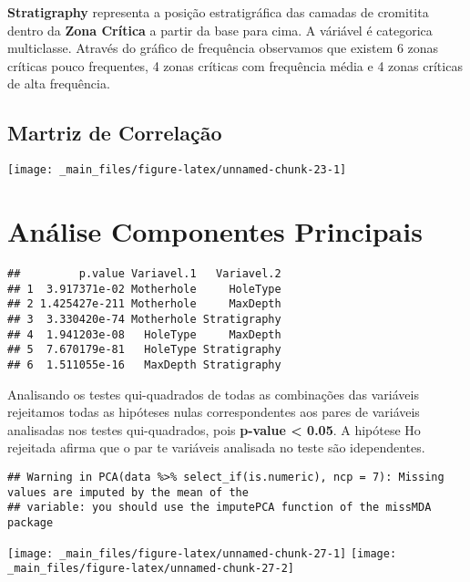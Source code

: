 \documentclass[
]{article}
\begin{document}
\textbf{Stratigraphy} representa a posição estratigráfica das camadas de cromitita dentro da \textbf{Zona Crítica} a partir da base para cima. A váriável é categorica multiclasse. Através do gráfico de frequência observamos que existem 6 zonas críticas pouco frequentes, 4 zonas críticas com frequência média e 4 zonas críticas de alta frequência.

\hypertarget{martriz-de-correlauxe7uxe3o}{%
\subsection{Martriz de Correlação}\label{martriz-de-correlauxe7uxe3o}}

\begin{center}\texttt{[image: \_main\_files/figure-latex/unnamed-chunk-23-1]} \end{center}

\newpage

\hypertarget{anuxe1lise-componentes-principais}{%
\section{Análise Componentes Principais}\label{anuxe1lise-componentes-principais}}

\begin{verbatim}
##         p.value Variavel.1   Variavel.2
## 1  3.917371e-02 Motherhole     HoleType
## 2 1.425427e-211 Motherhole     MaxDepth
## 3  3.330420e-74 Motherhole Stratigraphy
## 4  1.941203e-08   HoleType     MaxDepth
## 5  7.670179e-81   HoleType Stratigraphy
## 6  1.511055e-16   MaxDepth Stratigraphy
\end{verbatim}

Analisando os testes qui-quadrados de todas as combinações das variáveis rejeitamos todas as hipóteses nulas correspondentes aos pares de variáveis analisadas nos testes qui-quadrados, pois \textbf{p-value \textless{} 0.05}. A hipótese Ho rejeitada afirma que o par te variáveis analisada no teste são idependentes.

\begin{verbatim}
## Warning in PCA(data %>% select_if(is.numeric), ncp = 7): Missing values are imputed by the mean of the
## variable: you should use the imputePCA function of the missMDA package
\end{verbatim}

\begin{center}\texttt{[image: \_main\_files/figure-latex/unnamed-chunk-27-1]} \texttt{[image: \_main\_files/figure-latex/unnamed-chunk-27-2]} \end{center}
\end{document}
